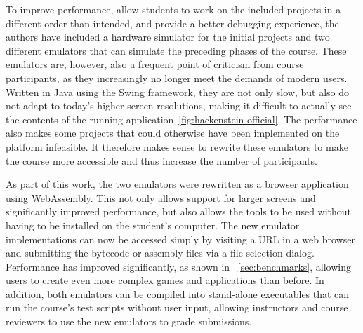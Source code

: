 To improve performance, allow students to work on the included projects in a different order than intended, and provide a better debugging experience, the authors have included a hardware simulator for the initial projects and two different emulators that can simulate the preceding phases of the course.
These emulators are, however, also a frequent point of criticism from course participants, as they increasingly no longer meet the demands of modern users.
Written in Java using the Swing framework, they are not only slow, but also do not adapt to today's higher screen resolutions, making it difficult to actually see the contents of the running application~\ref{fig:hackenstein-official}.
The performance also makes some projects that could otherwise have been implemented on the platform infeasible.
It therefore makes sense to rewrite these emulators to make the course more accessible and thus increase the number of participants.

As part of this work, the two emulators were rewritten as a browser application using WebAssembly. This not only allows support for larger screens and significantly improved performance, but also allows the tools to be used without having to be installed on the student's computer.
The new emulator implementations can now be accessed simply by visiting a URL in a web browser and submitting the bytecode or assembly files via a file selection dialog. Performance has improved significantly, as shown in ~\cref{sec:benchmarks}, allowing users to create even more complex games and applications than before.
In addition, both emulators can be compiled into stand-alone executables that can run the course's test scripts without user input, allowing instructors and course reviewers to use the new emulators to grade submissions.

